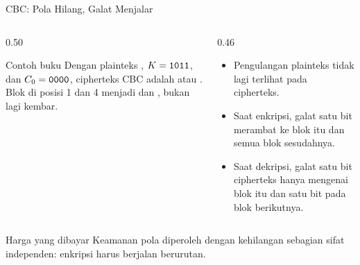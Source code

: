 \documentclass[aspectratio=169,11pt]{beamer}
\begin{document}
\begin{frame}{CBC: Pola Hilang, Galat Menjalar}
    \begin{columns}[T,onlytextwidth]
        \begin{column}{0.50\textwidth}
            \begin{exampleblock}{Contoh buku}
                \footnotesize
                Dengan plainteks , $K=\texttt{1011}$, dan
                $C_0=\texttt{0000}$, cipherteks CBC adalah
                 atau .
                Blok  di posisi 1 dan 4 menjadi 
                dan , bukan lagi kembar.
            \end{exampleblock}
        \end{column}
        \begin{column}{0.46\textwidth}
            \footnotesize
            \begin{itemize}
                \item Pengulangan plainteks tidak lagi terlihat pada
                      cipherteks.
                \item Saat enkripsi, galat satu bit merambat ke blok itu
                      dan semua blok sesudahnya.
                \item Saat dekripsi, galat satu bit cipherteks hanya
                      mengenai blok itu dan satu bit pada blok berikutnya.
            \end{itemize}
        \end{column}
    \end{columns}
    \vspace{0.15cm}
    \begin{block}{Harga yang dibayar}
        \footnotesize
        Keamanan pola diperoleh dengan kehilangan sebagian sifat
        independen: enkripsi harus berjalan berurutan.
    \end{block}
\end{frame}
\end{document}
